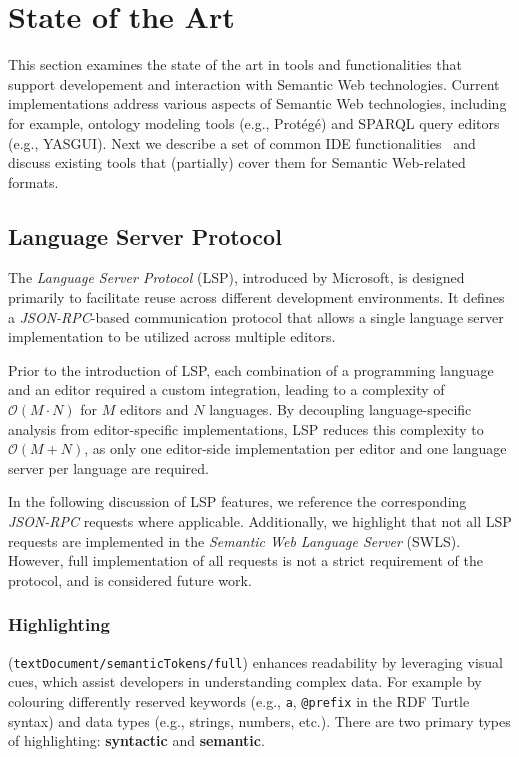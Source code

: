 
\section{State of the Art}%
\label{sec:related_work}

This section examines the state of the art in tools and functionalities that support developement and interaction with Semantic Web technologies. 
Current implementations address various aspects of Semantic Web technologies, including for example, ontology modeling tools (e.g., Protégé) and SPARQL query editors (e.g., YASGUI).
Next we describe a set of common IDE functionalities~\cite{HowAreJava} and discuss existing tools that (partially) cover them for Semantic Web-related formats.


\subsection{Language Server Protocol}

The \textit{Language Server Protocol} (LSP), introduced by Microsoft, is designed primarily to facilitate reuse across different development environments.
It defines a \textit{JSON-RPC}-based communication protocol that allows a single language server implementation to be utilized across multiple editors.

Prior to the introduction of LSP, each combination of a programming language and an editor required a custom integration, leading to a complexity of \(\mathcal{O}(M \cdot N)\) for \(M\) editors and \(N\) languages\cite{Kj_r_Rask_2021}.
By decoupling language-specific analysis from editor-specific implementations, LSP reduces this complexity to \(\mathcal{O}(M + N)\), as only one editor-side implementation per editor and one language server per language are required.

In the following discussion of LSP features, we reference the corresponding \textit{JSON-RPC} requests where applicable.
Additionally, we highlight that not all LSP requests are implemented in the \textit{Semantic Web Language Server} (SWLS).
However, full implementation of all requests is not a strict requirement of the protocol, and is considered future work.


\subsubsection{Highlighting} (\texttt{textDocument/semanticTokens/full}) enhances readability by leveraging visual cues, which assist developers in understanding complex data.
For example by colouring differently reserved keywords (e.g., \texttt{a}, \texttt{@prefix} in the RDF Turtle syntax) and data types (e.g., strings, numbers, etc.).  
There are two primary types of highlighting: \textbf{syntactic} and \textbf{semantic}.

